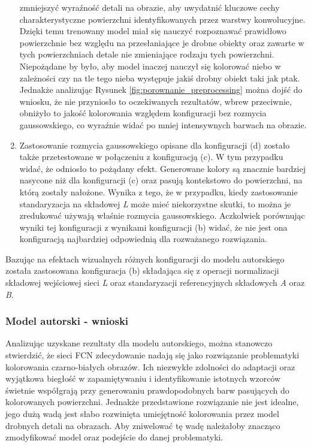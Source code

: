 \begin{enumerate}[label=(\alph*)]
    zmniejszyć wyraźność detali na obrazie, aby uwydatnić kluczowe cechy charakterystyczne
    powierzchni identyfikowanych przez warstwy konwolucyjne. Dzięki temu trenowany
    model miał się nauczyć rozpoznawać prawidłowo powierzchnie bez względu na
    przesłaniające je drobne obiekty oraz zawarte w tych powierzchniach detale
    nie zmieniające rodzaju tych powierzchni. Niepożądane by było,
    aby model inaczej nauczył się kolorować niebo w zależności czy na tle tego
    nieba występuje jakiś drobny obiekt taki jak ptak. Jednakże analizując
    Rysunek \ref{fig:porownanie_preprocessing} można dojść do wniosku, że nie
    przyniosło to oczekiwanych rezultatów, wbrew przeciwnie, obniżyło to jakość
    kolorowania względem konfiguracji bez rozmycia gaussowskiego, co wyraźnie
    widać po mniej intensywnych barwach na obrazie.
    \item Zastosowanie rozmycia gaussowskiego opisane dla konfiguracji (d)
    zostało także przetestowane w połączeniu z konfiguracją (c). W tym
    przypadku widać, że odniosło to pożądany efekt. Generowane kolory są znacznie
    bardziej nasycone niż dla konfiguracji (c) oraz pasują kontekstowo do
    powierzchni, na którą zostały nałożone. Wynika z tego, że w przypadku, kiedy zastosowanie
    standaryzacja na składowej \textit{L} może mieć niekorzystne skutki, to
    można je zredukować używają właśnie rozmycia gaussowskiego. Aczkolwiek
    porównując wyniki tej konfiguracji z wynikami konfiguracji (b) widać, że
    nie jest ona konfiguracją najbardziej odpowiednią dla rozważanego
    rozwiązania.
  \end{enumerate}

  \noindent
  Bazując na efektach wizualnych różnych konfiguracji do modelu autorskiego
  została zastosowana konfiguracja (b) składająca się z operacji
  normalizacji składowej wejściowej sieci \textit{L} oraz standaryzacji
  referencyjnych składowych \textit{A} oraz \textit{B}.

  \subsubsection{Model autorski - wnioski}

  Analizując uzyskane rezultaty dla modelu autorskiego, można stanowczo
  stwierdzić, że sieci FCN zdecydowanie nadają się jako rozwiązanie problematyki kolorowania
  czarno-białych obrazów. Ich niezwykłe zdolności do adaptacji oraz wyjątkowa
  biegłość w zapamiętywaniu i identyfikowanie istotnych wzorców świetnie współgrają
  przy generowaniu prawdopodobnych barw pasujących do kolorowanych powierzchni.
  Jednakże przedstawione rozwiązanie nie jest idealne, jego dużą wadą jest
  słabo rozwinięta umiejętność kolorowania przez model drobnych detali na obrazach.
  Aby zniwelować tę wadę należałoby znacząco zmodyfikować model oraz podejście do
  danej problematyki.

